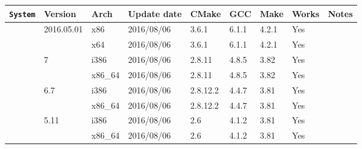 \documentclass[11pt,twoside,openany,x11names,svgnames]{memoir}
\begin{document}
{\footnotesize
\begin{longtable}{| >{\bfseries}p{3cm} | p{2cm} | p{1cm} | p{2cm} | p{1.2cm} | p{1cm} | p{1cm} | p{1cm} | p{1.5cm} |}
	\hline
	
	\texttt{System}                               & Version                        & Arch   & Update date & CMake  & GCC   & Make  & Works & Notes \\
	
	\hline
	\hline
	
	\multirow{2}{*}{\texttt{Arch Linux}}          & \multirow{2}{*}{2016.05.01}    & x86    & 2016/08/06  & 3.6.1    & 6.1.1 & 4.2.1 & Yes   &  \\
											    							       \cline{3-8}
	                                              &                                & x64    & 2016/08/06  & 3.6.1    & 6.1.1 & 4.2.1 & Yes   &  \\
	                                             
	\hline
	\hline
	
	\multirow{6}{*}{\texttt{CentOS}}              & \multirow{2}{*}{7}             & i386   & 2016/08/06  & 2.8.11   & 4.8.5 & 3.82  & Yes   &  \\
																		           \cline{3-8}
	                                              &                                & x86\_64& 2016/08/06  & 2.8.11   & 4.8.5 & 3.82  & Yes   &  \\
	                                              \cline{2-8}
	                                              & \multirow{2}{*}{6.7}           & i386   & 2016/08/06  & 2.8.12.2 & 4.4.7 & 3.81  & Yes   &  \\
	                                         							           \cline{3-8}
	                                              &                                & x86\_64& 2016/08/06  & 2.8.12.2 & 4.4.7 & 3.81  & Yes   &  \\
	                                              \cline{2-8}
	                                              & \multirow{2}{*}{5.11}          & i386   & 2016/08/06  & 2.6      & 4.1.2 & 3.81  & Yes   &  \\
	                                         							           \cline{3-8}
	                                              &                                & x86\_64& 2016/08/06  & 2.6      & 4.1.2 & 3.81  & Yes   &  \\
	                                             
	\hline
	\hline
	

\end{longtable}}
\end{document}
